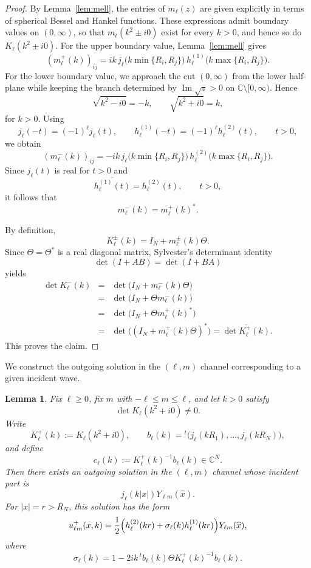 \documentclass[a4paper,11pt]{article}
\numberwithin{equation}{section}
\newcommand{\C}{\mathbb{C}}
\newcommand{\jj}[1]{j_{#1}}
\newcommand{\hj}[1]{h^{(1)}_{#1}}
\renewcommand{\Im}{\operatorname{Im}}
\newtheorem{lem}[thm]{Lemma}
\theoremstyle{definition}
\theoremstyle{remark}
\begin{document}
\begin{proof}
By Lemma~\ref{lem:mell}, the entries of $m_\ell(z)$ are given explicitly in
terms of spherical Bessel and Hankel functions. These expressions admit
boundary values on $(0,\infty)$, so that $m_\ell(k^2\pm i0)$ exist for every
$k>0$, and hence so do $K_\ell(k^2\pm i0)$.
%
For the upper boundary value, Lemma~\ref{lem:mell} gives
\[
(m_\ell^+(k))_{ij}
=
ik\,\jj{\ell}\bigl(k\min\{R_i,R_j\}\bigr)\,
\hj{\ell}\bigl(k\max\{R_i,R_j\}\bigr).
\]
For the lower boundary value, we approach the cut $(0,\infty)$ from the lower
half-plane while keeping the branch determined by $\Im\sqrt{z}>0$ on
$\C\setminus[0,\infty)$. Hence
\[
\sqrt{k^2-i0}=-k,
\qquad
\sqrt{k^2+i0}=k,
\]
for $k>0$.
Using
\[
\jj{\ell}(-t)=(-1)^\ell\jj{\ell}(t),
\qquad
\hj{\ell}(-t)=(-1)^\ell h_\ell^{(2)}(t),
\qquad t>0,
\]
we obtain
\[
(m_\ell^-(k))_{ij}
=
-ik\,\jj{\ell}\bigl(k\min\{R_i,R_j\}\bigr)\,
h_\ell^{(2)}\bigl(k\max\{R_i,R_j\}\bigr).
\]
Since $\jj{\ell}(t)$ is real for $t>0$ and
\[
\overline{\hj{\ell}(t)}=h_\ell^{(2)}(t),
\qquad t>0,
\]
it follows that
\[
m_\ell^-(k)=m_\ell^+(k)^*.
\]

By definition,
\[
K_\ell^\pm(k)=I_N+m_\ell^\pm(k)\Theta.
\]
Since $\Theta=\Theta^*$ is a real diagonal matrix, Sylvester's determinant
identity
\[
\det(I+AB)=\det(I+BA)
\]
yields
\begin{eqnarray*}
\det K_\ell^-(k)
&=&
\det\bigl(I_N+m_\ell^-(k)\Theta\bigr)
\\
&=&
\det\bigl(I_N+\Theta m_\ell^-(k)\bigr)
\\
&=&
\det\bigl(I_N+\Theta m_\ell^+(k)^*\bigr)
\\
&=&
\det\bigl((I_N+m_\ell^+(k)\Theta)^*\bigr) = \overline{\det K_\ell^+(k)}.
\end{eqnarray*}
This proves the claim.
\end{proof}

We construct the outgoing solution in the $(\ell,m)$ channel corresponding to
a given incident wave.

\begin{lem}
\label{lem:partial-wave-construction}
Fix $\ell\ge0$, fix $m$ with $-\ell\le m\le\ell$, and let
$k>0$ satisfy
\[
\det K_\ell(k^2+i0)\neq0.
\]
Write
\[
K_\ell^+(k):=K_\ell(k^2+i0),
\qquad
b_\ell(k)
=
{}^t\bigl(\jj{\ell}(kR_1),\ldots,\jj{\ell}(kR_N)\bigr),
\]
and define
\[
c_\ell(k):=K_\ell^+(k)^{-1}b_\ell(k)\in\C^N.
\]
Then there exists an outgoing solution in the $(\ell,m)$ channel whose
incident part is
\[
\jj{\ell}(k|x|)Y_{\ell m}(\widehat x).
\]
For $|x|=r>R_N$, this solution has the form
\begin{equation}\label{eq:ext-form-lemma}
u_{\ell m}^+(x,k)
=
\frac12
\Bigl(
h_\ell^{(2)}(kr)+\sigma_\ell(k)\hj{\ell}(kr)
\Bigr)
Y_{\ell m}(\widehat x),
\end{equation}
where
\begin{equation}\label{eq:sigma-lemma}
\sigma_\ell(k)
=
1-2ik\,{}^t b_\ell(k)\Theta K_\ell^+(k)^{-1}b_\ell(k).
\end{equation}
\end{lem}
\end{document}
